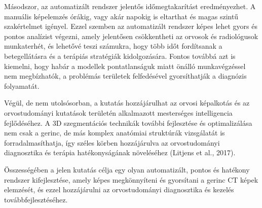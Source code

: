 Másodszor, az automatizált rendszer jelentős időmegtakarítást eredményezhet. A manuális képelemzés órákig, vagy akár napokig is eltarthat és magas szintű szakértelmet igényel. Ezzel szemben az automatizált rendszer képes lehet gyors és pontos analízist végezni, amely jelentősen csökkentheti az orvosok és radiológusok munkaterhét, és lehetővé teszi számukra, hogy több időt fordítsanak a betegellátásra és a terápiás stratégiák kidolgozására. Fontos továbbá azt is kiemelni, hogy habár a modellek pontatlanságuk miatt önálló munkavégzéssel nem megbízhatók, a problémás területek felfedésével gyorsíthatják a diagnózis folyamatát.

Végül, de nem utolsósorban, a kutatás hozzájárulhat az orvosi képalkotás és az orvostudományi kutatások területén alkalmazott mesterséges intelligencia fejlődéséhez. A 3D szegmentációs technikák további fejlesztése és optimalizálása nem csak a gerinc, de más komplex anatómiai struktúrák vizsgálatát is forradalmasíthatja, így széles körben hozzájárulva az orvostudományi diagnosztika és terápia hatékonyságának növeléséhez (Litjens et al., 2017).

Összességében a jelen kutatás célja egy olyan automatizált, pontos és hatékony rendszer kifejlesztése, amely képes megkönnyíteni és gyorsítani a gerinc CT képek elemzését, és ezzel hozzájárulni az orvostudományi diagnosztika és kezelés továbbfejlesztéséhez.



